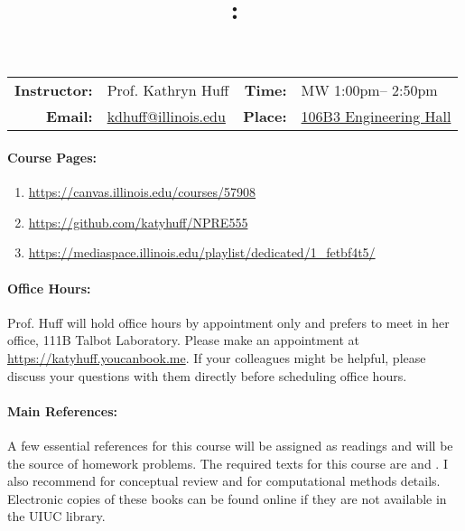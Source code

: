 \documentclass[11pt, a4paper]{article}
\title{\CourseNumber: \CourseTitle\\}
\author{\CourseUniversity}
\date{\CourseSemester \CourseYear}
\makeatletter
\newcommand{\CourseNumber}{NPRE555}
\newcommand{\CourseDays}{MW\xspace}%
\newcommand{\CourseStart}{1:00pm\xspace}%
\newcommand{\CourseEnd}{2:50pm\xspace}%
\newcommand{\CourseInstructor}{Prof. Kathryn Huff}
\newcommand{\CourseInstructorEmail}{kdhuff@illinois.edu}
\newcommand{\CourseRoom}{\href{https://maps.app.goo.gl/mv1KTevxS3pmbSim6}{106B3 Engineering Hall}\xspace}%
\newcommand{\CourseBuilding}{\xspace}%
\newcommand{\HuffOffice}{111B Talbot Laboratory\xspace}
\newcommand{\TeachingAssistant}{TA Name\xspace}%
\newcommand{\TAOfficeHourDays}{Wednesdays\xspace}%
\newcommand{\TAOfficeHourStart}{1:00pm\xspace}%
\newcommand{\TAOfficeHourEnd}{3:00pm\xspace}%
\newcommand{\TAOfficeHourPlace}{123 Talbot Laboratory\xspace}
\makeatother
\begin{document}
\maketitle
\renewcommand{\arraystretch}{2}
\begin{center}
\begin{table}[h]
\begin{tabularx}{\textwidth}{rXrX}
\hline
\textbf{Instructor:} & \CourseInstructor & \textbf{Time:} & \CourseDays \CourseStart -- \CourseEnd \\
\textbf{Email:} &  \href{mailto:\CourseInstructorEmail}{\CourseInstructorEmail} & \textbf{Place:} & \CourseRoom \CourseBuilding\\
\hline
\end{tabularx}

\end{table}
\end{center}

\paragraph{Course Pages:}
\begin{enumerate}
        \item \url{https://canvas.illinois.edu/courses/57908}
        \item \url{https://github.com/katyhuff/\CourseNumber}
        \item \url{https://mediaspace.illinois.edu/playlist/dedicated/1_fetbf4t5/}
\end{enumerate}


\paragraph{Office Hours:} Prof. Huff will hold office hours by appointment 
only and prefers to meet in her office, \HuffOffice. Please make an appointment at 
\url{https://katyhuff.youcanbook.me}. If your colleagues might be helpful, please 
discuss your questions with them directly before scheduling office hours.

\paragraph{Main References:}
A few essential references for this course will be assigned as readings and 
will be the source of homework problems. The required texts for this course are 
\cite{stacey_nuclear_2007} and \cite{bell_nuclear_1970}. I also recommend 
\cite{duderstadt_transport_1979} for conceptual review and 
\cite{lewis_computational_1993} for computational methods details.
Electronic copies of these books can be found online if they are not available
in the UIUC library.
\end{document}
